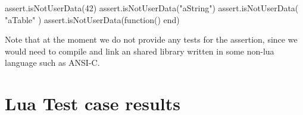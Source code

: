 \startLuaTest
  assert.isNotUserData(42)
  assert.isNotUserData("aString")
  assert.isNotUserData({ "aTable" })
  assert.isNotUserData(function() end)
\stopLuaTest
\stopTestCase

\godown[2ex]
Note that at the moment we do not provide any  tests for 
the  assertion, since we would need to compile 
and link an shared library written in some non-lua language such as 
ANSI-C. 

\stopTestSuite

\section{Lua Test case results}

\reportLuaStats

\reportFailures

\stopchapter
